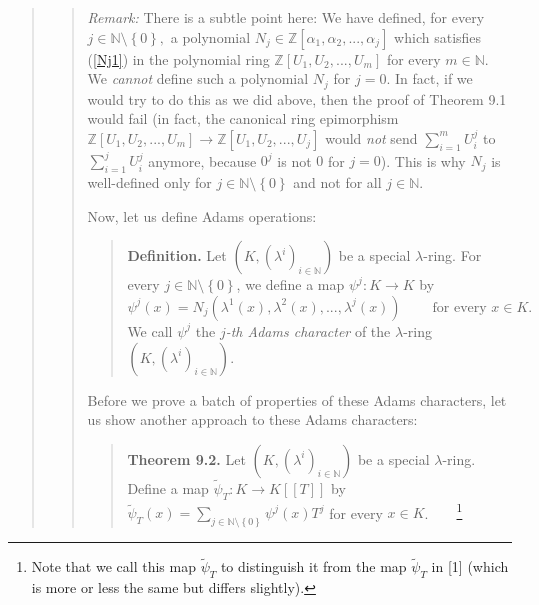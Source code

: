 \documentclass[12pt,final,notitlepage,onecolumn,german]{article}%
\begin{document}
\begin{quote}
\begin{quote}
\textit{Remark:} There is a subtle point here: We have defined, for every
$j\in\mathbb{N}\setminus\left\{  0\right\}  ,$ a polynomial $N_{j}%
\in\mathbb{Z}\left[  \alpha_{1},\alpha_{2},...,\alpha_{j}\right]  $ which
satisfies (\ref{Nj1}) in the polynomial ring $\mathbb{Z}\left[  U_{1}%
,U_{2},...,U_{m}\right]  $ for every $m\in\mathbb{N}$. We \textit{cannot}
define such a polynomial $N_{j}$ for $j=0$. In fact, if we would try to do
this as we did above, then the proof of Theorem 9.1 would fail (in fact, the
canonical ring epimorphism $\mathbb{Z}\left[  U_{1},U_{2},...,U_{m}\right]
\rightarrow\mathbb{Z}\left[  U_{1},U_{2},...,U_{j}\right]  $ would
\textit{not} send $\sum\limits_{i=1}^{m}U_{i}^{j}$ to $\sum\limits_{i=1}%
^{j}U_{i}^{j}$ anymore, because $0^{j}$ is not $0$ for $j=0$). This is why
$N_{j}$ is well-defined only for $j\in\mathbb{N}\setminus\left\{  0\right\}  $
and not for all $j\in\mathbb{N}$.

Now, let us define Adams operations:

\begin{quote}
\textbf{Definition.} Let $\left(  K,\left(  \lambda^{i}\right)  _{i\in
\mathbb{N}}\right)  $ be a special $\lambda$-ring. For every $j\in
\mathbb{N}\setminus\left\{  0\right\}  $, we define a map $\psi^{j}%
:K\rightarrow K$ by%
\begin{equation}
\psi^{j}\left(  x\right)  =N_{j}\left(  \lambda^{1}\left(  x\right)
,\lambda^{2}\left(  x\right)  ,...,\lambda^{j}\left(  x\right)  \right)
\ \ \ \ \ \ \ \ \ \ \text{for every }x\in K. \label{PsiDef}%
\end{equation}
We call $\psi^{j}$ the $j$\textit{-th Adams character} of the $\lambda$-ring
$\left(  K,\left(  \lambda^{i}\right)  _{i\in\mathbb{N}}\right)  $.
\end{quote}

Before we prove a batch of properties of these Adams characters, let us show
another approach to these Adams characters:

\begin{quote}
\textbf{Theorem 9.2.} Let $\left(  K,\left(  \lambda^{i}\right)
_{i\in\mathbb{N}}\right)  $ be a special $\lambda$-ring. Define a map
$\widetilde{\psi}_{T}:K\rightarrow K\left[  \left[  T\right]  \right]  $ by
$\widetilde{\psi}_{T}\left(  x\right)  =\sum\limits_{j\in\mathbb{N}%
\setminus\left\{  0\right\}  }\psi^{j}\left(  x\right)  T^{j}$ for every $x\in
K$.\ \ \ \ \footnote{Note that we call this map $\widetilde{\psi}_{T}$ to
distinguish it from the map $\widetilde{\psi}_{T}$ in [1] (which is more or
less the same but differs slightly).}


\end{quote}
\end{quote}
\end{quote}
\end{document}
